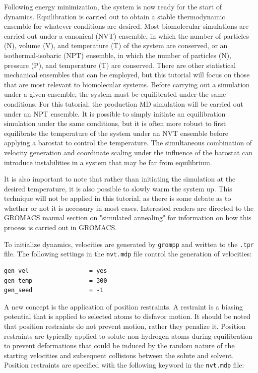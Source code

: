 \documentclass[9pt,tutorial,pubversion]{livecoms}
\begin{document}
Following energy minimization, the system is now ready for the start of dynamics. Equilibration is carried out to obtain a stable thermodynamic ensemble for whatever conditions are desired. Most biomolecular simulations are carried out under a canonical (NVT) ensemble, in which the number of particles (N), volume (V), and temperature (T) of the system are conserved, or an isothermal-isobaric (NPT) ensemble, in which the number of particles (N), pressure (P), and temperature (T) are conserved. There are other statistical mechanical ensembles that can be employed, but this tutorial will focus on those that are most relevant to biomolecular systems. Before carrying out a simulation under a given ensemble, the system must be equilibrated under the same conditions. For this tutorial, the production MD simulation will be carried out under an NPT ensemble. It is possible to simply initiate an equilibration simulation under the same conditions, but it is often more robust to first equilibrate the temperature of the system under an NVT ensemble before applying a barostat to control the temperature. The simultaneous combination of velocity generation and coordinate scaling under the influence of the barostat can introduce instabilities in a system that may be far from equilibrium.

It is also important to note that rather than initiating the simulation at the desired temperature, it is also possible to slowly warm the system up. This technique will not be applied in this tutorial, as there is some debate as to whether or not it is necessary in most cases. Interested readers are directed to the GROMACS manual section on "simulated annealing" for information on how this process is carried out in GROMACS.

To initialize dynamics, velocities are generated by \texttt{grompp} and written to the \texttt{.tpr} file. The following settings in the \texttt{nvt.mdp} file control the generation of velocities:

\begin{lstlisting}
gen_vel                 = yes
gen_temp                = 300
gen_seed                = -1
\end{lstlisting}

A new concept is the application of position restraints. A restraint is a biasing potential that is applied to selected atoms to disfavor motion. It should be noted that position restraints do not prevent motion, rather they penalize it. Position restraints are typically applied to solute non-hydrogen atoms during equilibration to prevent deformations that could be induced by the random nature of the starting velocities and subsequent collisions between the solute and solvent. Position restraints are specified with the following keyword in the \texttt{nvt.mdp} file:
\end{document}
